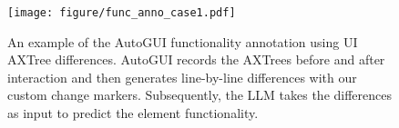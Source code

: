 \begin{figure}[th]
    \centering
    \texttt{[image: figure/func\_anno\_case1.pdf]}
    \caption{An example of the AutoGUI functionality annotation using UI AXTree differences. AutoGUI records the AXTrees before and after interaction and then generates line-by-line differences with our custom change markers. Subsequently, the LLM takes the differences as input to predict the element functionality.}
    \label{fig: funcpred diff case}
\end{figure}
